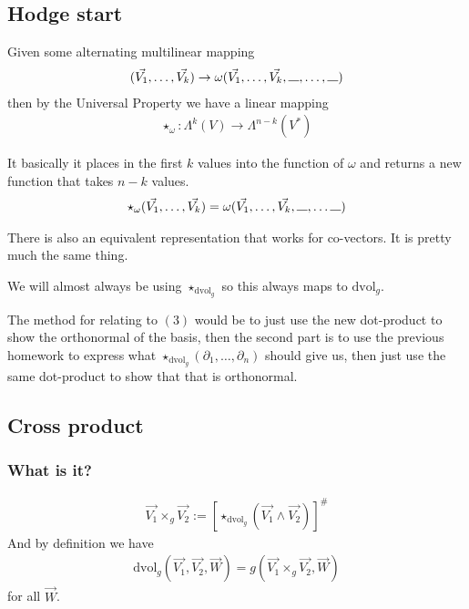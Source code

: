 \documentclass[12pt]{armath}
\newcommand{\ra}{\rightarrow}
\newcommand{\dvol}{\text{dvol}_g}
\newcommand{\bs}{\rule{0.3cm}{0.15mm}}
\newcommand{\kpn}[1]{\partial_{1},\ldots,\partial_{#1}}
\begin{document}
  \subsection{Hodge start}%
  \label{sub:hodge_start}

  Given some alternating multilinear mapping
  \begin{align*}
    (\vec{V_1},\ldots,\vec{V_k})\ra\omega(\vec{V_1},\ldots,\vec{V_k},\bs,\ldots,\bs)
  \end{align*}
  then by the Universal Property we have a linear mapping
  \begin{align*}
    \star_\omega:\Lambda^k(V)\ra\Lambda^{n-k}(V^*)
  \end{align*}

  It basically it places in the first $k$ values into the function of $\omega$
  and returns a new function that takes $n-k$ values.
  \begin{align*}
    \star_\omega(\vec{V_1},\ldots,\vec{V_k})=\omega(\vec{V_1},\ldots,\vec{V_k},\bs,\ldots\bs)
  \end{align*}

  There is also an equivalent representation that works for co-vectors. It is
  pretty much the same thing.

  We will almost always be using $\star_{\dvol}$ so this always maps to
  $\dvol$.

  The method for relating to $(3)$ would be to just use the new dot-product to
  show the orthonormal of the basis, then the second part is to use the
  previous homework to express what $\star_{\dvol}(\kpn{n})$ should give us, then
  just use the same dot-product to show that that is orthonormal.

  \subsection{Cross product}%
  \label{sub:cross_product}

  \subsubsection{What is it?}%
  \label{ssub:what_is_it_}

  \begin{align*}
    \vec{V_1}\times_g\vec{V_2}:={\left[\star_{\text{dvol}_g}(\vec{V_1}\wedge\vec{V_2})\right]}^\#
  \end{align*}
  And by definition we have
  \begin{align*}
    \dvol(\vec{V_1},\vec{V_2},\vec{W})=g(\vec{V_1}\times_g\vec{V_2},\vec{W})
  \end{align*}
  for all $\vec{W}$.
\end{document}
